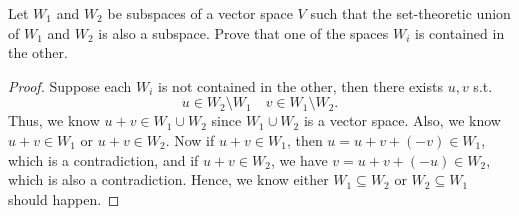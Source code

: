 \begin{problem}
Let \(W_1\) and \(W_2\) be subspaces of a vector space \(V\) such that the set-theoretic union of \(W_1\) and \(W_2\) is also a subspace. Prove that one of the spaces \(W_i\) is contained in the other.
\end{problem}
\begin{proof}
    Suppose each \(W_i\) is not contained in the other, then there exists \(u, v\) s.t. 
    \[
        u \in W_2 \setminus W_1 \quad v \in W_1 \setminus W_2. 
    \]  
    Thus, we know \(u + v \in W_1 \cup W_2\) since \(W_1 \cup W_2\) is a vector space. Also, we know \(u + v \in W_1\) or \(u + v \in W_2\). Now if \(u + v \in W_1\), then \(u = u+v + (-v) \in W_1\), which is a contradiction, and if \(u + v \in W_2\), we have \(v = u + v + (-u) \in W_2\), which is also a contradiction. Hence, we know either \(W_1 \subseteq W_2\) or \(W_2 \subseteq W_1\) should happen.        
\end{proof}

